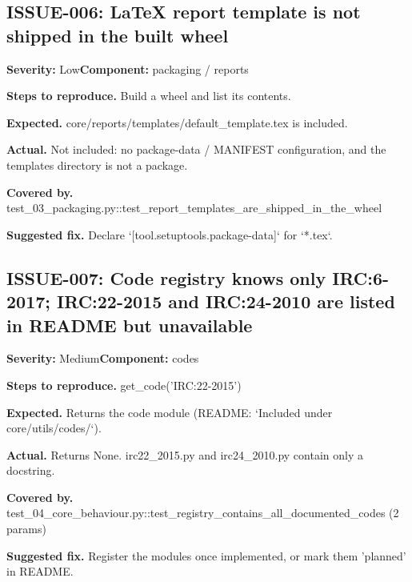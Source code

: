 \subsection*{ISSUE-006: LaTeX report template is not shipped in the built wheel}
\textbf{Severity:} Low\quad \textbf{Component:} packaging /\allowbreak{} reports\par
\textbf{Steps to reproduce.} Build a wheel and list its contents.\allowbreak{}\par
\textbf{Expected.} core/\allowbreak{}reports/\allowbreak{}templates/\allowbreak{}default\_\allowbreak{}template.\allowbreak{}tex is included.\allowbreak{}\par
\textbf{Actual.} Not included: no package-data /\allowbreak{} MANIFEST configuration, and the templates directory is not a package.\allowbreak{}\par
\textbf{Covered by.} test\_\allowbreak{}03\_\allowbreak{}packaging.\allowbreak{}py::\allowbreak{}test\_\allowbreak{}report\_\allowbreak{}templates\_\allowbreak{}are\_\allowbreak{}shipped\_\allowbreak{}in\_\allowbreak{}the\_\allowbreak{}wheel\par
\textbf{Suggested fix.} Declare `[tool.\allowbreak{}setuptools.\allowbreak{}package-data]` for `*.\allowbreak{}tex`.\allowbreak{}

\subsection*{ISSUE-007: Code registry knows only IRC:6-2017; IRC:22-2015 and IRC:24-2010 are listed in README but unavailable}
\textbf{Severity:} Medium\quad \textbf{Component:} codes\par
\textbf{Steps to reproduce.} get\_\allowbreak{}code('IRC:22-2015')\par
\textbf{Expected.} Returns the code module (README: `Included under core/\allowbreak{}utils/\allowbreak{}codes/\allowbreak{}`).\allowbreak{}\par
\textbf{Actual.} Returns None.\allowbreak{} irc22\_\allowbreak{}2015.\allowbreak{}py and irc24\_\allowbreak{}2010.\allowbreak{}py contain only a docstring.\allowbreak{}\par
\textbf{Covered by.} test\_\allowbreak{}04\_\allowbreak{}core\_\allowbreak{}behaviour.\allowbreak{}py::\allowbreak{}test\_\allowbreak{}registry\_\allowbreak{}contains\_\allowbreak{}all\_\allowbreak{}documented\_\allowbreak{}codes (2 params)\par
\textbf{Suggested fix.} Register the modules once implemented, or mark them 'planned' in README.\allowbreak{}

